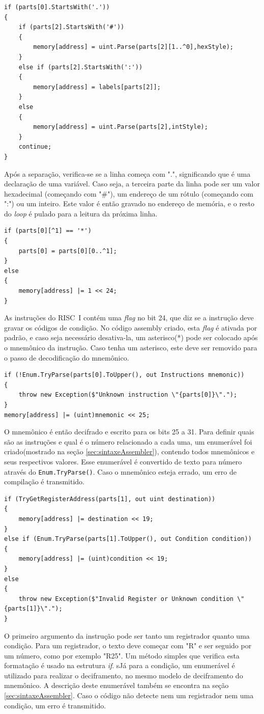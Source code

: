 \documentclass[
	article,			%
	11pt,				%
	oneside,			%
	a4paper,			%
	english,			%
	brazil,				%
	sumario=tradicional
	]{abntex2}
\begin{document}
\begin{lstlisting}
if (parts[0].StartsWith('.'))
{
    if (parts[2].StartsWith('#'))
    {
        memory[address] = uint.Parse(parts[2][1..^0],hexStyle);
    }
    else if (parts[2].StartsWith(':'))
    {
        memory[address] = labels[parts[2]];
    }
    else                    
    {
        memory[address] = uint.Parse(parts[2],intStyle);
    }
    continue;
}
\end{lstlisting}
Após a separação, verifica-se se a linha começa com ".", significando que é uma declaração de uma variável. Caso seja, a terceira parte da linha pode ser um valor hexadecimal (começando com "\#"), um endereço de um rótulo (começando com ":") ou um inteiro. Este valor é então gravado no endereço de memória, e o resto do \textit{loop} é pulado para a leitura da próxima linha.

\begin{lstlisting}
if (parts[0][^1] == '*')
{
    parts[0] = parts[0][0..^1];
}
else
{
    memory[address] |= 1 << 24;
}
\end{lstlisting}
As instruções do RISC~I contém uma \textit{flag} no bit 24, que diz se a instrução deve gravar os códigos de condição. No código assembly criado, esta \textit{flag} é ativada por padrão, e caso seja necessário desativa-la, um asterisco(*) pode ser colocado após o mnemônico da instrução. Caso tenha um asterisco, este deve ser removido para o passo de decodificação do mnemônico.
\begin{lstlisting}
if (!Enum.TryParse(parts[0].ToUpper(), out Instructions mnemonic))
{
    throw new Exception($"Unknown instruction \"{parts[0]}\".");
}
memory[address] |= (uint)mnemonic << 25;
\end{lstlisting}
O mnemônico é então decifrado e escrito para os bits 25 a 31. Para definir quais são as instruções e qual é o número relacionado a cada uma, um enumerável foi criado(mostrado na seção \ref{sec:sintaxeAssembler}), contendo todos mnemônicos e seus respectivos valores. Esse enumerável é convertido de texto para número através do \texttt{Enum.TryParse()}. Caso o mnemônico esteja errado, um erro de compilação é transmitido.

\begin{lstlisting}
if (TryGetRegisterAddress(parts[1], out uint destination))
{
    memory[address] |= destination << 19;
}
else if (Enum.TryParse(parts[1].ToUpper(), out Condition condition))
{
    memory[address] |= (uint)condition << 19;
}
else
{
    throw new Exception($"Invalid Register or Unknown condition \"{parts[1]}\".");
}
\end{lstlisting}
O primeiro argumento da instrução pode ser tanto um registrador quanto uma condição. Para um registrador, o texto deve começar com "R" e ser seguido por um número, como por exemplo "R25". Um método simples que verifica esta formatação é usado na estrutura \textit{if}. sJá para a condição, um enumerável é utilizado para realizar o deciframento, no mesmo modelo de deciframento do mnemônico. A descrição deste enumerável também se encontra na seção \ref{sec:sintaxeAssembler}. Caso o código não detecte nem um registrador nem uma condição, um erro é transmitido.
\end{document}
